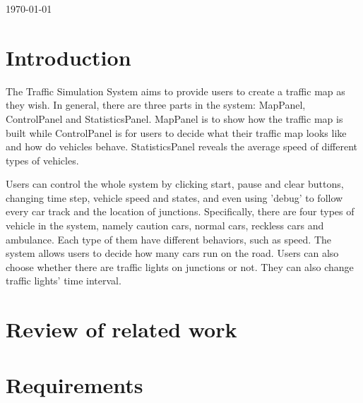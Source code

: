 \documentclass[a4paper,12pt]{article}
\begin{document}
\begin{titlepage}
{\large \today}\\[3cm] %




\vfill %

\end{titlepage}


\tableofcontents

\section{Introduction}
The Traffic Simulation System aims to provide users to create a traffic map as they wish. In general, there are three parts in the system: MapPanel, ControlPanel and StatisticsPanel. MapPanel is to show how the traffic map is built while ControlPanel is for users to decide what their traffic map looks like and how do vehicles behave. StatisticsPanel reveals the average speed of different types of vehicles.

Users can control the whole system by clicking start, pause and clear buttons, changing time step, vehicle speed and states, and even using 'debug' to follow every car track and the location of junctions. Specifically, there are four types of vehicle in the system, namely caution cars, normal cars, reckless cars and ambulance. Each type of them have different behaviors, such as speed. The system allows users to decide how many cars run on the road. Users can also choose whether there are traffic lights on junctions or not. They can also change traffic lights' time interval.

\section{Review of related work}

\section{Requirements}
\end{document}
